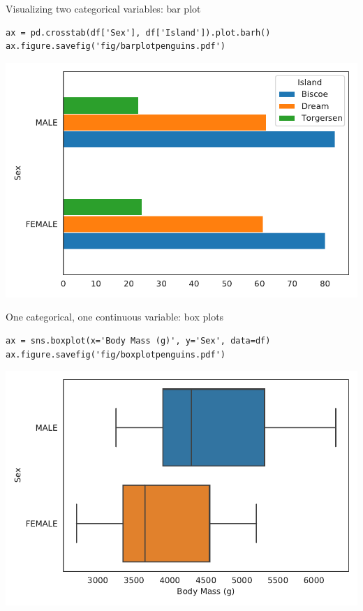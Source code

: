 \documentclass[aspectratio=169,usenames,dvipsnames]{beamer}
\begin{document}
\begin{frame}[fragile]{Visualizing two categorical variables: bar plot}
\begin{lstlisting}
ax = pd.crosstab(df['Sex'], df['Island']).plot.barh()
ax.figure.savefig('fig/barplotpenguins.pdf')
\end{lstlisting}

\includegraphics[height=0.7\textheight]{fig/barplotpenguins}
\end{frame}

\begin{frame}[fragile]{One categorical, one continuous variable: box plots}
\begin{lstlisting}
ax = sns.boxplot(x='Body Mass (g)', y='Sex', data=df)
ax.figure.savefig('fig/boxplotpenguins.pdf')
\end{lstlisting}
\includegraphics[height=0.7\textheight]{fig/boxplotpenguins}
\end{frame}
\end{document}
